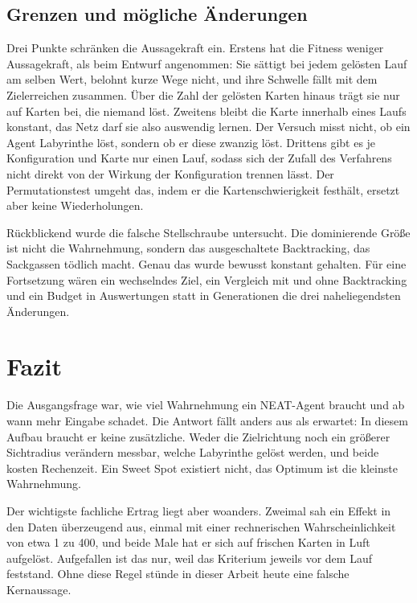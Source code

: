 \documentclass[sigconf]{acmart}
\begin{document}
\subsection{Grenzen und mögliche Änderungen}
Drei Punkte schränken die Aussagekraft ein. Erstens hat die Fitness weniger Aussagekraft, als beim Entwurf angenommen: Sie sättigt bei jedem gelösten Lauf am selben Wert, belohnt kurze Wege nicht, und ihre Schwelle fällt mit dem Zielerreichen zusammen. Über die Zahl der gelösten Karten hinaus trägt sie nur auf Karten bei, die niemand löst. Zweitens bleibt die Karte innerhalb eines Laufs konstant, das Netz darf sie also auswendig lernen. Der Versuch misst nicht, ob ein Agent Labyrinthe löst, sondern ob er diese zwanzig löst. Drittens gibt es je Konfiguration und Karte nur einen Lauf, sodass sich der Zufall des Verfahrens nicht direkt von der Wirkung der Konfiguration trennen lässt. Der Permutationstest umgeht das, indem er die Kartenschwierigkeit festhält, ersetzt aber keine Wiederholungen.

Rückblickend wurde die falsche Stellschraube untersucht. Die dominierende Größe ist nicht die Wahrnehmung, sondern das ausgeschaltete Backtracking, das Sackgassen tödlich macht. Genau das wurde bewusst konstant gehalten. Für eine Fortsetzung wären ein wechselndes Ziel, ein Vergleich mit und ohne Backtracking und ein Budget in Auswertungen statt in Generationen die drei naheliegendsten Änderungen.

\section{Fazit}
\label{sec:fazit}
Die Ausgangsfrage war, wie viel Wahrnehmung ein NEAT-Agent braucht und ab wann mehr Eingabe schadet. Die Antwort fällt anders aus als erwartet: In diesem Aufbau braucht er keine zusätzliche. Weder die Zielrichtung noch ein größerer Sichtradius verändern messbar, welche Labyrinthe gelöst werden, und beide kosten Rechenzeit. Ein Sweet Spot existiert nicht, das Optimum ist die kleinste Wahrnehmung.

Der wichtigste fachliche Ertrag liegt aber woanders. Zweimal sah ein Effekt in den Daten überzeugend aus, einmal mit einer rechnerischen Wahrscheinlichkeit von etwa 1 zu 400, und beide Male hat er sich auf frischen Karten in Luft aufgelöst. Aufgefallen ist das nur, weil das Kriterium jeweils vor dem Lauf feststand. Ohne diese Regel stünde in dieser Arbeit heute eine falsche Kernaussage.



\end{document}
